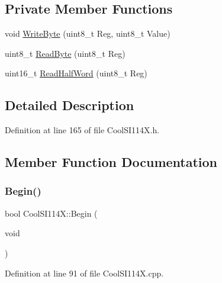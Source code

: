 \subsection*{Private Member Functions}
\begin{DoxyCompactItemize}
\item 
void \hyperlink{class_cool_s_i114_x_ac5c8dc5ade604da7a1c8cd1586feefc2}{Write\+Byte} (uint8\+\_\+t Reg, uint8\+\_\+t Value)
\item 
uint8\+\_\+t \hyperlink{class_cool_s_i114_x_acc20f8037e156ec4aadcbe90780b1e8b}{Read\+Byte} (uint8\+\_\+t Reg)
\item 
uint16\+\_\+t \hyperlink{class_cool_s_i114_x_a1d25c9e137874af529804c2ec796a6b9}{Read\+Half\+Word} (uint8\+\_\+t Reg)
\end{DoxyCompactItemize}


\subsection{Detailed Description}


Definition at line 165 of file Cool\+S\+I114\+X.\+h.



\subsection{Member Function Documentation}
\mbox{\label{class_cool_s_i114_x_a206b36aca7049f63be1d11088c30a09f}} 
\subsubsection{\texorpdfstring{Begin()}{Begin()}}
{\footnotesize\ttfamily bool Cool\+S\+I114\+X\+::\+Begin (\begin{DoxyParamCaption}\item[{void}]{ }\end{DoxyParamCaption})}



Definition at line 91 of file Cool\+S\+I114\+X.\+cpp.


